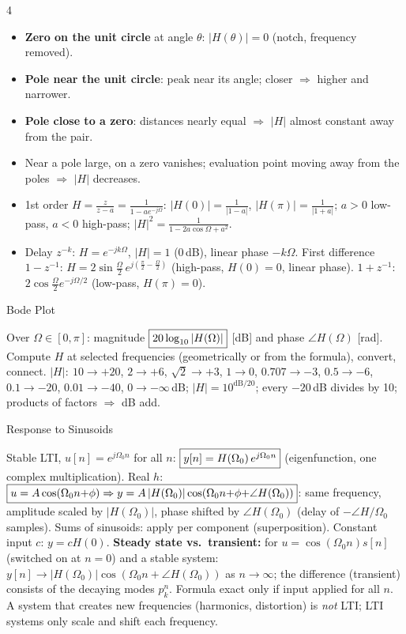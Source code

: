 \documentclass[a4paper,landscape]{article}
\newcommand{\sub}[1]{\par\vspace{0.6pt}\noindent\colorbox{subblue}{\parbox{\dimexpr\linewidth-2\fboxsep}{\bfseries\strut #1}}\par\vspace{0.2pt}}
\newcommand{\bx}[1]{\fbox{$\textstyle #1$}}
\begin{document}
\begin{multicols*}{4}
\begin{itemize}
\item \textbf{Zero on the unit circle} at angle $\theta$: $|H(\theta)|=0$ (notch, frequency removed).
\item \textbf{Pole near the unit circle}: peak near its angle; closer $\Rightarrow$ higher and narrower.
\item \textbf{Pole close to a zero}: distances nearly equal $\Rightarrow$ $|H|$ almost constant away from the pair.
\item Near a pole large, on a zero vanishes; evaluation point moving away from the poles $\Rightarrow$ $|H|$ decreases.
\item 1st order $H=\frac{z}{z-a}=\frac1{1-ae^{-j\Omega}}$: $|H(0)|=\frac1{|1-a|}$, $|H(\pi)|=\frac1{|1+a|}$; $a{>}0$ low-pass, $a{<}0$ high-pass; $|H|^2=\frac1{1-2a\cos\Omega+a^2}$.
\item Delay $z^{-k}$: $H=e^{-jk\Omega}$, $|H|=1$ (0\,dB), linear phase $-k\Omega$. First difference $1{-}z^{-1}$: $H=2\sin\frac\Omega2\,e^{j(\frac\pi2-\frac\Omega2)}$ (high-pass, $H(0){=}0$, linear phase). $1{+}z^{-1}$: $2\cos\frac\Omega2e^{-j\Omega/2}$ (low-pass, $H(\pi){=}0$).
\end{itemize}
\sub{Bode Plot}
Over $\Omega\in[0,\pi]$: magnitude $\bx{20\log_{10}|H(\Omega)|}$ [dB] and phase $\angle H(\Omega)$ [rad]. Compute $H$ at selected frequencies (geometrically or from the formula), convert, connect.
$|H|\!:\ 10\to+20$, $2\to+6$, $\sqrt2\to+3$, $1\to0$, $0.707\to-3$, $0.5\to-6$, $0.1\to-20$, $0.01\to-40$, $0\to-\infty$\,dB; $|H|=10^{\text{dB}/20}$; every $-20$\,dB divides by 10; products of factors $\Rightarrow$ dB add.
\sub{Response to Sinusoids}
Stable LTI, $u[n]=e^{j\Omega_0n}$ for all $n$: $\bx{y[n]=H(\Omega_0)\,e^{j\Omega_0n}}$ (eigenfunction, one complex multiplication).
Real $h$: \ $\bx{u=A\cos(\Omega_0n{+}\phi)\Rightarrow y=A\,|H(\Omega_0)|\cos(\Omega_0n{+}\phi{+}\angle H(\Omega_0))}$:
same frequency, amplitude scaled by $|H(\Omega_0)|$, phase shifted by $\angle H(\Omega_0)$ (delay of $-\angle H/\Omega_0$ samples). Sums of sinusoids: apply per component (superposition). Constant input $c$: $y=cH(0)$.
\textbf{Steady state vs.\ transient:} for $u=\cos(\Omega_0n)s[n]$ (switched on at $n{=}0$) and a stable system: $y[n]\to|H(\Omega_0)|\cos(\Omega_0n{+}\angle H(\Omega_0))$ as $n\to\infty$; the difference (transient) consists of the decaying modes $p_k^n$. Formula exact only if input applied for all $n$.
A system that creates new frequencies (harmonics, distortion) is \emph{not} LTI; LTI systems only scale and shift each frequency.
\end{multicols*}
\end{document}
